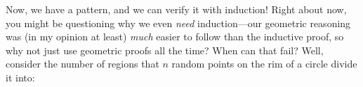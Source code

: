 \documentclass[10pt]{article}
\theoremstyle{definition}
\begin{document}
Now, we have a pattern, and we can verify it with induction!  Right
about now, you might be questioning why we even \emph{need}
induction---our geometric reasoning was (in my opinion at least)
\emph{much} easier to follow than the inductive proof, so why not just
use geometric proofs all the time?  When can that fail?  Well,
consider the number of regions that $n$ random points on the rim of a
circle divide it into:
\begin{figure}[H]
    \centering
    \begin{minipage}{.3\textwidth}
    \end{minipage}
        \begin{minipage}{.3\textwidth}
        \end{minipage}
    \begin{minipage}{.3\textwidth}
    \end{minipage}
\end{figure}
%
%
%
%
\end{document}
